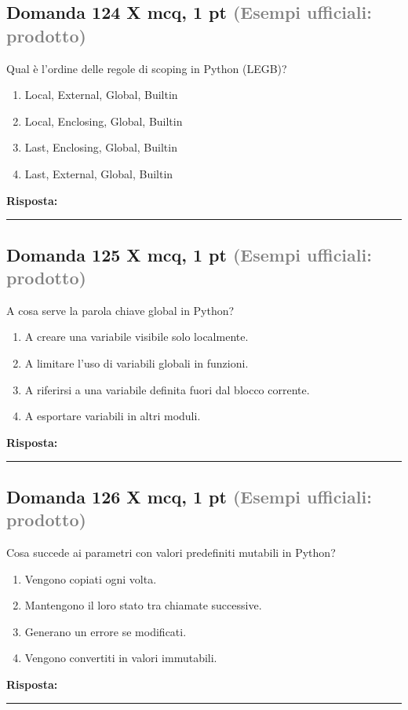 \documentclass[a4paper,11pt]{article}
\begin{document}
\subsection*{Domanda 124 X \hfill {\small mcq, 1 pt \textcolor{gray}{(Esempi ufficiali: prodotto)}}}
Qual è l'ordine delle regole di scoping in Python (LEGB)?

\begin{enumerate}[label=\alph*)]
\item Local, External, Global, Builtin
\item Local, Enclosing, Global, Builtin
\item Last, Enclosing, Global, Builtin
\item Last, External, Global, Builtin
\end{enumerate}
\vspace{0.2cm}
\noindent\textbf{Risposta:}\par
\vspace{1.5cm}\hrule


\subsection*{Domanda 125 X \hfill {\small mcq, 1 pt \textcolor{gray}{(Esempi ufficiali: prodotto)}}}
A cosa serve la parola chiave global in Python?

\begin{enumerate}[label=\alph*)]
\item A creare una variabile visibile solo localmente.
\item A limitare l'uso di variabili globali in funzioni.
\item A riferirsi a una variabile definita fuori dal blocco corrente.
\item A esportare variabili in altri moduli.
\end{enumerate}
\vspace{0.2cm}
\noindent\textbf{Risposta:}\par
\vspace{1.5cm}\hrule


\subsection*{Domanda 126 X \hfill {\small mcq, 1 pt \textcolor{gray}{(Esempi ufficiali: prodotto)}}}
Cosa succede ai parametri con valori predefiniti mutabili in Python?

\begin{enumerate}[label=\alph*)]
\item Vengono copiati ogni volta.
\item Mantengono il loro stato tra chiamate successive.
\item Generano un errore se modificati.
\item Vengono convertiti in valori immutabili.
\end{enumerate}
\vspace{0.2cm}
\noindent\textbf{Risposta:}\par
\vspace{1.5cm}\hrule
\end{document}
